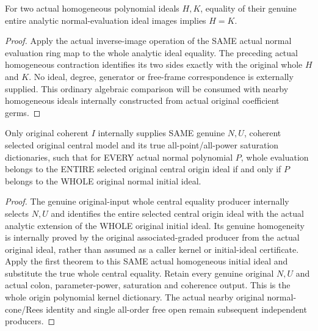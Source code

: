\begin{theorem}
\label{hir:relative-normal-homogeneous-analytic-extension-faithful}
\leanok
For two actual homogeneous polynomial ideals $H,K$, equality of their genuine entire analytic normal-evaluation ideal images implies $H=K$.
\end{theorem}
\begin{proof}
Apply the actual inverse-image operation of the SAME actual normal evaluation ring map to the whole analytic ideal equality. The preceding actual homogeneous contraction identifies its two sides exactly with the original whole $H$ and $K$. No ideal, degree, generator or free-frame correspondence is externally supplied. This ordinary algebraic comparison will be consumed with nearby homogeneous ideals internally constructed from actual original coefficient germs.
\end{proof}

\begin{theorem}
\label{hir:relative-normal-original-central-whole-polynomial-kernel}
\leanok
Only original coherent $I$ internally supplies SAME genuine $N,U$, coherent selected original central model and its true all-point/all-power saturation dictionaries, such that for EVERY actual normal polynomial $P$, whole evaluation belongs to the ENTIRE selected original central origin ideal if and only if $P$ belongs to the WHOLE original normal initial ideal.
\end{theorem}
\begin{proof}
The genuine original-input whole central equality producer internally selects $N,U$ and identifies the entire selected central origin ideal with the actual analytic extension of the WHOLE original initial ideal. Its genuine homogeneity is internally proved by the original associated-graded producer from the actual original ideal, rather than assumed as a caller kernel or initial-ideal certificate. Apply the first theorem to this SAME actual homogeneous initial ideal and substitute the true whole central equality. Retain every genuine original $N,U$ and actual colon, parameter-power, saturation and coherence output. This is the whole origin polynomial kernel dictionary. The actual nearby original normal-cone/Rees identity and single all-order free open remain subsequent independent producers.
\end{proof}
